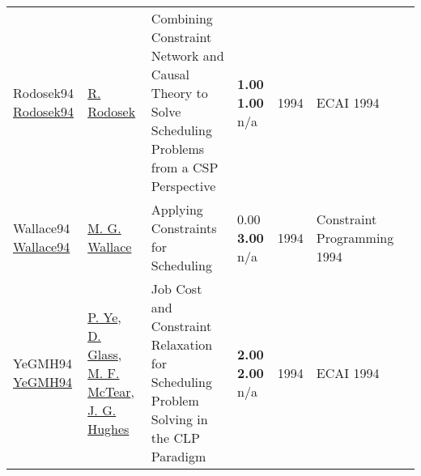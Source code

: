 {\begin{longtable}{p{3cm}p{5cm}p{10cm}p{1cm}rp{2.5cm}l}
Rodosek94 \href{}{Rodosek94} & \hyperref[auth:a297]{R. Rodosek} & Combining Constraint Network and Causal Theory to Solve Scheduling Problems from a {CSP} Perspective & \noindent{}\textbf{1.00} \textbf{1.00} n/a & 1994 & ECAI 1994 & \cite{Rodosek94}\\
Wallace94 \href{}{Wallace94} & \hyperref[auth:a117]{M. G. Wallace} & Applying Constraints for Scheduling & \noindent{}\textcolor{black!50}{0.00} \textbf{3.00} n/a & 1994 & Constraint Programming 1994 & \cite{Wallace94}\\
YeGMH94 \href{}{YeGMH94} & \hyperref[auth:a1256]{P. Ye}, \hyperref[auth:a1257]{D. Glass}, \hyperref[auth:a1258]{M. F. McTear}, \hyperref[auth:a1259]{J. G. Hughes} & Job Cost and Constraint Relaxation for Scheduling Problem Solving in the {CLP} Paradigm & \noindent{}\textbf{2.00} \textbf{2.00} n/a & 1994 & ECAI 1994 & \cite{YeGMH94}\\
\end{longtable}
}

